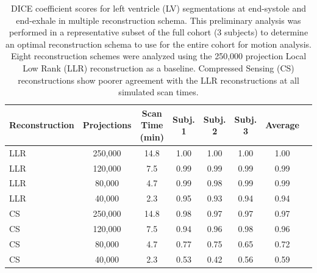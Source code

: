 \begin{table}[ht]
    \centering
    \caption[DICE coefficient scores of LV segmentation]{DICE coefficient scores for left ventricle (LV) segmentations at end-systole and end-exhale in multiple reconstruction schema. This preliminary analysis was performed in a representative subset of the full cohort (3 subjects) to determine an optimal reconstruction schema to use for the entire cohort for motion analysis. Eight reconstruction schemes were analyzed using the 250,000 projection Local Low Rank (LLR) reconstruction as a baseline. Compressed Sensing (CS) reconstructions show poorer agreement with the LLR reconstructions at all simulated scan times.}\label{tab:dsc}
    \footnotesize
    \ifFinal{}
    \fi
    \vspace{0.25cm}
    \begin{tabular}{lccccccc}
    \toprule
    \textbf{Reconstruction} & \textbf{Projections} & \textbf{Scan Time (min)} & \textbf{Subj. 1} & \textbf{Subj. 2} & \textbf{Subj. 3} & \textbf{Average} \\
    \midrule
    LLR & 250{,}000 & 14.8 & 1.00 & 1.00 & 1.00 & 1.00 \\
    LLR & 120{,}000 &  7.5 & 0.99 & 0.99 & 0.99 & 0.99 \\
    LLR & 80{,}000  &  4.7 & 0.99 & 0.98 & 0.99 & 0.99 \\
    LLR & 40{,}000  &  2.3 & 0.95 & 0.93 & 0.94 & 0.94 \\
    \midrule
    CS  & 250{,}000 & 14.8 & 0.98 & 0.97 & 0.97 & 0.97 \\
    CS  & 120{,}000 &  7.5 & 0.94 & 0.96 & 0.98 & 0.96 \\
    CS  & 80{,}000  &  4.7 & 0.77 & 0.75 & 0.65 & 0.72 \\
    CS  & 40{,}000  &  2.3 & 0.53 & 0.42 & 0.56 & 0.59 \\
    \bottomrule
    \end{tabular}
\end{table}

